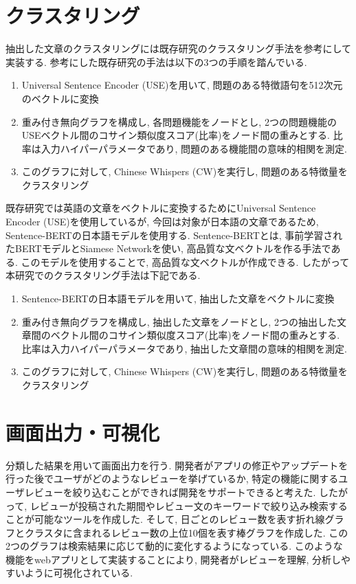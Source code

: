
\section{クラスタリング}
抽出した文章のクラスタリングには既存研究のクラスタリング手法\cite{sira}を参考にして実装する. 参考にした既存研究の手法は以下の3つの手順を踏んでいる. 
\begin{enumerate}
  \item Universal Sentence Encoder (USE)を用いて, 問題のある特徴語句を512次元のベクトルに変換
  \item 重み付き無向グラフを構成し, 各問題機能をノードとし, 2つの問題機能のUSEベクトル間のコサイン類似度スコア(比率)をノード間の重みとする. 比率は入力ハイパーパラメータであり, 問題のある機能間の意味的相関を測定. 
  \item このグラフに対して, Chinese Whispers (CW)を実行し, 問題のある特徴量をクラスタリング
\end{enumerate}

既存研究では英語の文章をベクトルに変換するためにUniversal Sentence Encoder (USE)を使用しているが, 今回は対象が日本語の文章であるため, Sentence-BERTの日本語モデルを使用する. Sentence-BERT\cite{sentence-bert}とは, 事前学習されたBERTモデルとSiamese Networkを使い, 高品質な文ベクトルを作る手法である. このモデルを使用することで, 高品質な文ベクトルが作成できる. 
したがって本研究でのクラスタリング手法は下記である. 
\begin{enumerate}
  \item Sentence-BERTの日本語モデルを用いて, 抽出した文章をベクトルに変換
  \item 重み付き無向グラフを構成し, 抽出した文章をノードとし, 2つの抽出した文章間のベクトル間のコサイン類似度スコア(比率)をノード間の重みとする. 比率は入力ハイパーパラメータであり, 抽出した文章間の意味的相関を測定. 
  \item このグラフに対して, Chinese Whispers (CW)を実行し, 問題のある特徴量をクラスタリング
\end{enumerate}


\section{画面出力・可視化}
分類した結果を用いて画面出力を行う. 開発者がアプリの修正やアップデートを行った後でユーザがどのようなレビューを挙げているか, 特定の機能に関するユーザレビューを絞り込むことができれば開発をサポートできると考えた. したがって, レビューが投稿された期間やレビュー文のキーワードで絞り込み検索することが可能なツールを作成した. そして, 日ごとのレビュー数を表す折れ線グラフとクラスタに含まれるレビュー数の上位10個を表す棒グラフを作成した. この2つのグラフは検索結果に応じて動的に変化するようになっている. 
このような機能をwebアプリとして実装することにより, 開発者がレビューを理解, 分析しやすいように可視化されている. 